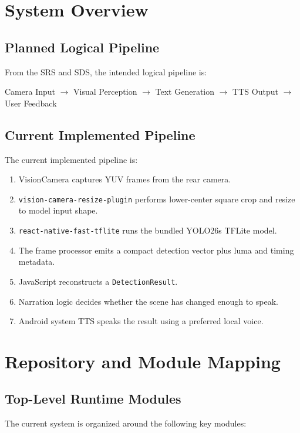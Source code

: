 \documentclass[conference]{IEEEtran}
\begin{document}
\section{System Overview}
\subsection{Planned Logical Pipeline}
From the SRS and SDS, the intended logical pipeline is:
\begin{center}
Camera Input $\rightarrow$ Visual Perception $\rightarrow$ Text Generation $\rightarrow$ TTS Output $\rightarrow$ User Feedback
\end{center}

\subsection{Current Implemented Pipeline}
The current implemented pipeline is:
\begin{enumerate}[leftmargin=1.2em]
\item VisionCamera captures YUV frames from the rear camera.
\item \texttt{vision-camera-resize-plugin} performs lower-center square crop and resize to model input shape.
\item \texttt{react-native-fast-tflite} runs the bundled YOLO26s TFLite model.
\item The frame processor emits a compact detection vector plus luma and timing metadata.
\item JavaScript reconstructs a \texttt{DetectionResult}.
\item Narration logic decides whether the scene has changed enough to speak.
\item Android system TTS speaks the result using a preferred local voice.
\end{enumerate}

\section{Repository and Module Mapping}
\subsection{Top-Level Runtime Modules}
The current system is organized around the following key modules:
\end{document}
